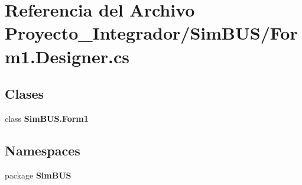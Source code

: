 \section{Referencia del Archivo Proyecto\-\_\-\-Integrador/\-Sim\-B\-U\-S/\-Form1.Designer.\-cs}
\label{_form1_8_designer_8cs}
\subsection*{Clases}
\begin{DoxyCompactItemize}
\item 
class {\bf Sim\-B\-U\-S.\-Form1}
\end{DoxyCompactItemize}
\subsection*{Namespaces}
\begin{DoxyCompactItemize}
\item 
package {\bf Sim\-B\-U\-S}
\end{DoxyCompactItemize}
